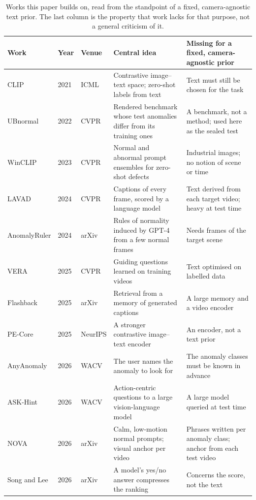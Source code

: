 \documentclass[a4paper,fleqn]{cas-sc}
\begin{document}
\begin{table}[width=\linewidth,cols=5,pos=htbp]
\caption{Works this paper builds on, read from the standpoint of a fixed,
camera-agnostic text prior. The last column is the property that work lacks for that
purpose, not a general criticism of it.}\label{tbl:litsum}
\footnotesize
\begin{tabularx}{\linewidth}{@{}W{2.3cm} l W{1.5cm} Z Z@{}}
\toprule
\textbf{Work} & \textbf{Year} & \textbf{Venue} & \textbf{Central idea} & \textbf{Missing for a fixed, camera-agnostic prior} \\
\midrule
CLIP \citep{radford2021clip} & 2021 & ICML & Contrastive image--text space; zero-shot labels from text & Text must still be chosen for the task \\
UBnormal \citep{acsintoae2022ubnormal} & 2022 & CVPR & Rendered benchmark whose test anomalies differ from its training ones & A benchmark, not a method; used here as the sealed test \\
WinCLIP \citep{jeong2023winclip} & 2023 & CVPR & Normal and abnormal prompt ensembles for zero-shot defects & Industrial images; no notion of scene or time \\
LAVAD \citep{zanella2024lavad} & 2024 & CVPR & Captions of every frame, scored by a language model & Text derived from each target video; heavy at test time \\
AnomalyRuler \citep{yang2024anomalyruler} & 2024 & arXiv & Rules of normality induced by GPT-4 from a few normal frames & Needs frames of the target scene \\
VERA \citep{ye2025vera} & 2025 & CVPR & Guiding questions learned on training videos & Text optimised on labelled data \\
Flashback \citep{lee2025flashback} & 2025 & arXiv & Retrieval from a memory of generated captions & A large memory and a video encoder \\
PE-Core \citep{bolya2025pe} & 2025 & NeurIPS & A stronger contrastive image--text encoder & An encoder, not a text prior \\
AnyAnomaly \citep{anyanomaly2025} & 2026 & WACV & The user names the anomaly to look for & The anomaly classes must be known in advance \\
ASK-Hint \citep{zou2026askhint} & 2026 & WACV & Action-centric questions to a large vision-language model & A large model queried at test time \\
NOVA \citep{yin2026nova} & 2026 & arXiv & Calm, low-motion normal prompts; visual anchor per video & Phrases written per anomaly class; anchor from each test video \\
Song and Lee \citep{song2026vlmanswer} & 2026 & arXiv & A model's yes/no answer compresses the ranking & Concerns the score, not the text \\
\bottomrule
\end{tabularx}
\end{table}
\end{document}
